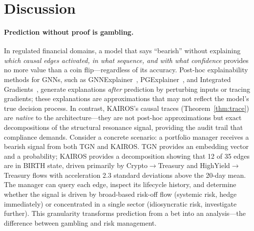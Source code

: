 \documentclass[11pt]{article}
\begin{document}
\section{Discussion}

\paragraph{Prediction without proof is gambling.} In regulated financial domains, a model that says ``bearish'' without explaining \emph{which causal edges activated, in what sequence, and with what confidence} provides no more value than a coin flip---regardless of its accuracy. Post-hoc explainability methods for GNNs, such as GNNExplainer~\citep{ying2019gnnexplainer}, PGExplainer~\citep{luo2020pgexplainer}, and Integrated Gradients~\citep{sundararajan2017integrated}, generate explanations \emph{after} prediction by perturbing inputs or tracing gradients; these explanations are approximations that may not reflect the model's true decision process. In contrast, KAIROS's causal traces (Theorem~\ref{thm:trace}) are \emph{native} to the architecture---they are not post-hoc approximations but exact decompositions of the structural resonance signal, providing the audit trail that compliance demands. Consider a concrete scenario: a portfolio manager receives a bearish signal from both TGN and KAIROS. TGN provides an embedding vector and a probability; KAIROS provides a decomposition showing that 12 of 35 edges are in BIRTH state, driven primarily by Crypto$\to$Treasury and HighYield$\to$Treasury flows with acceleration 2.3 standard deviations above the 20-day mean. The manager can query each edge, inspect its lifecycle history, and determine whether the signal is driven by broad-based risk-off flow (systemic risk, hedge immediately) or concentrated in a single sector (idiosyncratic risk, investigate further). This granularity transforms prediction from a bet into an analysis---the difference between gambling and risk management.
\end{document}
